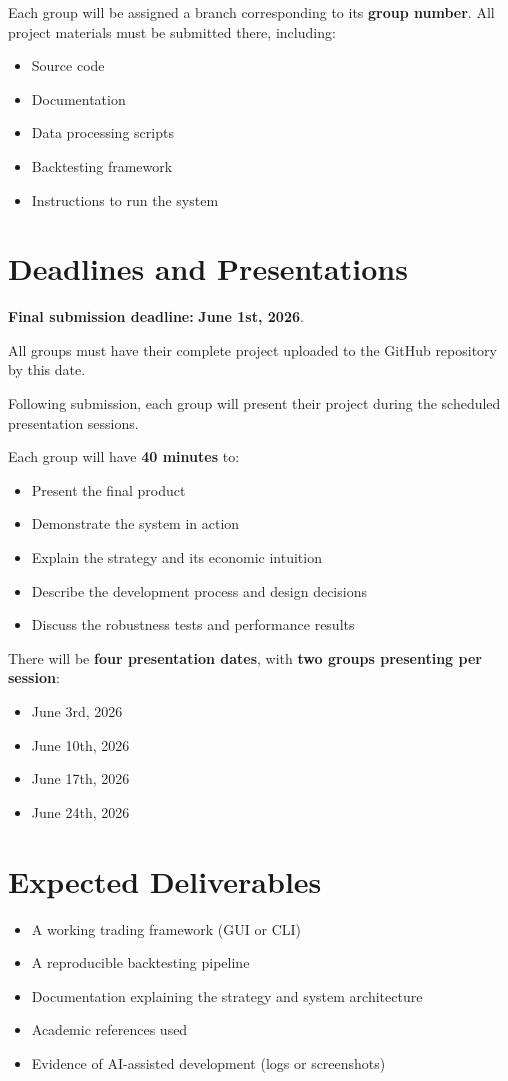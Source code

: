 \documentclass[12pt]{article}
\begin{document}
\noindent Each group will be assigned a branch corresponding to its
\textbf{group number}. All project materials must be submitted there,
including:

\begin{itemize}
\item Source code
\item Documentation
\item Data processing scripts
\item Backtesting framework
\item Instructions to run the system
\end{itemize}

\section*{Deadlines and Presentations}

\textbf{Final submission deadline:} \textbf{June 1st, 2026}.

\noindent All groups must have their complete project uploaded to the GitHub repository
by this date.

\noindent Following submission, each group will present their project during the
scheduled presentation sessions.

\noindent Each group will have \textbf{40 minutes} to:

\begin{itemize}
\item Present the final product
\item Demonstrate the system in action
\item Explain the strategy and its economic intuition
\item Describe the development process and design decisions
\item Discuss the robustness tests and performance results
\end{itemize}

\noindent There will be \textbf{four presentation dates}, with \textbf{two groups presenting
per session}:

\begin{itemize}
\item June 3rd, 2026
\item June 10th, 2026
\item June 17th, 2026
\item June 24th, 2026
\end{itemize}

\section*{Expected Deliverables}

\begin{itemize}
\item A working trading framework (GUI or CLI)
\item A reproducible backtesting pipeline
\item Documentation explaining the strategy and system architecture
\item Academic references used
\item Evidence of AI-assisted development (logs or screenshots)
\end{itemize}
\end{document}
